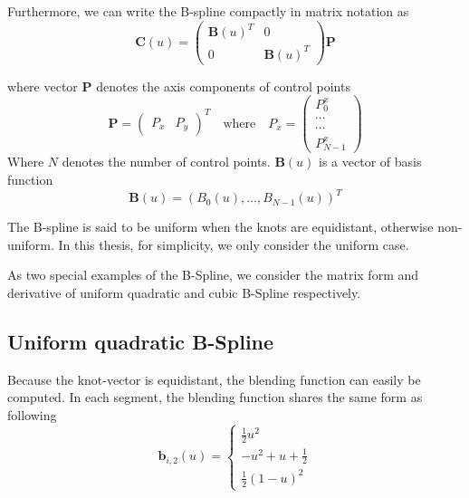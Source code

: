 Furthermore, we can write the B-spline compactly in matrix notation as 
\begin{equation}
  \label{eq:4.3}
  \mathbf{C}(u) = 
  \begin{pmatrix}
\mathbf{B}(u)^T & 0 \\
0 &\mathbf{B}(u)^T
  \end{pmatrix}
\mathbf{P}
\end{equation}

where vector $\mathbf{P}$ denotes the axis components of control
points
\begin{equation}
  \label{eq:4.4}
  \mathbf{P} =
  \begin{pmatrix}
    P_x & P_y    
  \end{pmatrix}^T \quad \mathrm{where} \quad P_x =
  \begin{pmatrix}
    P_0^x\\
    \cdots\\
    \cdots\\
    P_{N-1}^x
  \end{pmatrix}
\end{equation}
Where $N$ denotes the number of control points. $\mathbf{B}(u)$ is a
vector of basis function
\begin{equation}
  \label{eq:4.5}
  \mathbf{B}(u) = (B_0(u), \ldots, B_{N-1}(u))^T
\end{equation}

The B-spline is said to be uniform when the knots are equidistant,
otherwise non-uniform. In this thesis, for simplicity, we only
consider the uniform case.

As two special examples of the B-Spline, we consider the matrix form and
derivative of uniform quadratic and cubic B-Spline respectively.

\subsection{Uniform quadratic B-Spline}
\label{sec:uqb}

Because the knot-vector is equidistant, the blending function can
easily be computed. In each segment, the blending function shares the
same form as following
\begin{equation}
  \label{eq:4.3}
  \mathbf{b}_{i,2}(u) = \begin{cases} \frac{1}{2}u^2 \\ -u^2 + u + \frac{1}{2} \\ \frac{1}{2}(1-u)^2   \end{cases}
\end{equation}


